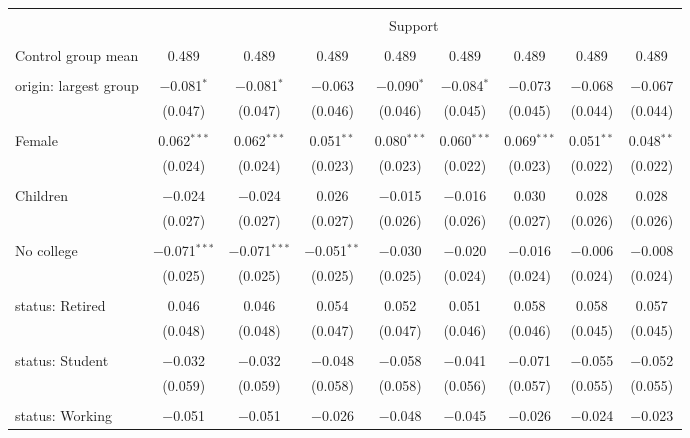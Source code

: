 
\begin{tabular}{@{\extracolsep{5pt}}lcccccccc} 
\\[-1.8ex]\hline 
\hline \\[-1.8ex] 
 & \multicolumn{8}{c}{Support} \\ 
\cline{2-9} 
\hline \\[-1.8ex] 
 Control group mean & 0.489 & 0.489 & 0.489 & 0.489 & 0.489 & 0.489 & 0.489 & 0.489  \\ \hline \\[-1.8ex] origin: largest group & $-$0.081$^{*}$ & $-$0.081$^{*}$ & $-$0.063 & $-$0.090$^{*}$ & $-$0.084$^{*}$ & $-$0.073 & $-$0.068 & $-$0.067 \\ 
  & (0.047) & (0.047) & (0.046) & (0.046) & (0.045) & (0.045) & (0.044) & (0.044) \\ 
  & & & & & & & & \\ 
 Female & 0.062$^{***}$ & 0.062$^{***}$ & 0.051$^{**}$ & 0.080$^{***}$ & 0.060$^{***}$ & 0.069$^{***}$ & 0.051$^{**}$ & 0.048$^{**}$ \\ 
  & (0.024) & (0.024) & (0.023) & (0.023) & (0.022) & (0.023) & (0.022) & (0.022) \\ 
  & & & & & & & & \\ 
 Children & $-$0.024 & $-$0.024 & 0.026 & $-$0.015 & $-$0.016 & 0.030 & 0.028 & 0.028 \\ 
  & (0.027) & (0.027) & (0.027) & (0.026) & (0.026) & (0.027) & (0.026) & (0.026) \\ 
  & & & & & & & & \\ 
 No college & $-$0.071$^{***}$ & $-$0.071$^{***}$ & $-$0.051$^{**}$ & $-$0.030 & $-$0.020 & $-$0.016 & $-$0.006 & $-$0.008 \\ 
  & (0.025) & (0.025) & (0.025) & (0.025) & (0.024) & (0.024) & (0.024) & (0.024) \\ 
  & & & & & & & & \\ 
 status: Retired & 0.046 & 0.046 & 0.054 & 0.052 & 0.051 & 0.058 & 0.058 & 0.057 \\ 
  & (0.048) & (0.048) & (0.047) & (0.047) & (0.046) & (0.046) & (0.045) & (0.045) \\ 
  & & & & & & & & \\ 
 status: Student & $-$0.032 & $-$0.032 & $-$0.048 & $-$0.058 & $-$0.041 & $-$0.071 & $-$0.055 & $-$0.052 \\ 
  & (0.059) & (0.059) & (0.058) & (0.058) & (0.056) & (0.057) & (0.055) & (0.055) \\ 
  & & & & & & & & \\ 
 status: Working & $-$0.051 & $-$0.051 & $-$0.026 & $-$0.048 & $-$0.045 & $-$0.026 & $-$0.024 & $-$0.023 \\ 

\end{tabular}
